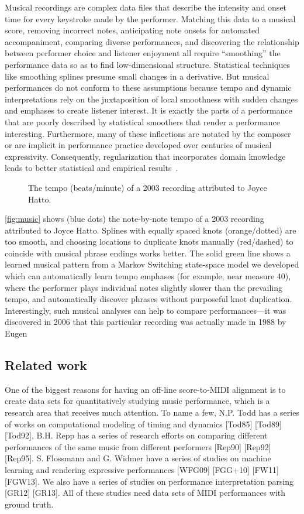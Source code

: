 \documentclass[12pt]{article}
\begin{document}
Musical recordings are complex data files that describe the intensity and onset time
for every keystroke made by the performer. Matching this data to a
musical score, removing incorrect notes, anticipating note onsets for
automated accompaniment, comparing diverse performances, and
discovering the relationship between performer choice and listener
enjoyment all require ``smoothing'' the performance data so as to find
low-dimensional structure. Statistical
techniques like smoothing splines presume small changes in a
derivative. 
But musical performances do not conform to these assumptions because tempo and
dynamic interpretations rely on the juxtaposition of local smoothness
with sudden changes and emphases to create listener interest. It is
exactly the parts of a performance that are poorly described by
statistical smoothers that render a performance
interesting. Furthermore, many of these inflections are notated by the
composer or are implicit in performance practice developed over
centuries of musical expressivity. Consequently, regularization that
incorporates domain knowledge leads to better statistical and
empirical results~\citep{McDonald2016}. 

\begin{figure}
  \centering
  \caption{The tempo (beats/minute) of a 2003 recording attributed to Joyce
    Hatto.}
  \label{fig:music}
\end{figure}
\autoref{fig:music}
shows (blue dots) the note-by-note tempo of a 2003 recording
attributed to Joyce Hatto. Splines with
equally spaced knots (orange/dotted) are too smooth, and choosing locations
to duplicate knots manually (red/dashed)
to coincide with musical phrase endings works better. The solid green line 
shows a learned musical pattern from a Markov Switching
state-space model we developed which can
automatically learn tempo emphases (for example, near measure 40),
where the performer plays individual notes slightly slower than the
prevailing tempo, and automatically discover phrases
without purposeful knot 
duplication. Interestingly, such musical analyses can help to compare
performances---it was discovered in 2006 that this
particular recording was actually made in 1988 by Eugen

\subsection{Related work}
One of the biggest reasons for having an off-line score-to-MIDI
alignment is to create data sets for quantitatively studying music
performance, which is a research area that receives much attention. To
name a few, N.P. Todd has a series of works on computational modeling
of timing and dynamics [Tod85] [Tod89] [Tod92], B.H. Repp has a series
of research efforts on comparing different performances of the same
music from different performers [Rep90] [Rep92] [Rep95]. S. Flossmann
and G. Widmer have a series of studies on machine learning and
rendering expressive performances [WFG09] [FGG+10] [FW11] [FGW13]. We
also have a series of studies on performance interpretation parsing
[GR12] [GR13]. All of these studies need data sets of MIDI
performances with ground truth. 
\end{document}
